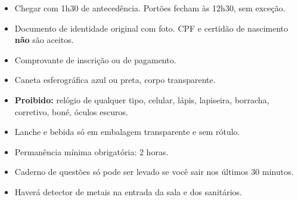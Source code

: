 \begin{itemize}
\item Chegar com 1h30 de antecedência. Portões fecham às 12h30, sem
exceção.
\item Documento de identidade original com foto. CPF e certidão de
nascimento \textbf{não} são aceitos.
\item Comprovante de inscrição ou de pagamento.
\item Caneta esferográfica azul ou preta, corpo transparente.
\item \textbf{Proibido:} relógio de qualquer tipo, celular, lápis,
lapiseira, borracha, corretivo, boné, óculos escuros.
\item Lanche e bebida só em embalagem transparente e sem rótulo.
\item Permanência mínima obrigatória: 2 horas.
\item Caderno de questões só pode ser levado se você sair nos últimos 30
minutos.
\item Haverá detector de metais na entrada da sala e dos sanitários.
\end{itemize}
